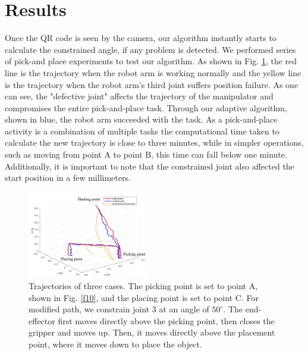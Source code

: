 \documentclass{ieeeaccess}
\newcommand{\degree}{^\circ}
\begin{document}

\section{Results}
\label{section:results}

Once the QR code is seen by the camera, our algorithm instantly starts to calculate the constrained angle, if any problem is detected. We performed series of pick-and place experiments to test our algorithm. As shown in Fig. \ref{f4}, the red line is the trajectory when the robot arm is working normally and the yellow line is the trajectory  when the robot arm's third joint suffers position failure. As one can see, the "defective joint" affects the trajectory of the manipulator and compromises the entire pick-and-place task. Through our adaptive algorithm, shown in blue, the robot arm succeeded with the task. As a pick-and-place activity is a combination of multiple tasks the computational time taken to calculate the new trajectory is close to three minutes, while in simpler operations, such as moving from point A to point B, this time can fall below one minute. Additionally, it is important to note that the constrained joint also affected the start position in a few millimeters.

\begin{figure}[t!]
	\centering \includegraphics[width=0.47\textwidth]{img/f4.pdf}\caption{Trajectories of three cases. The picking point is set to point A, shown in Fig. \ref{f10}, and the placing point is set to point C. For modified path, we constrain joint 3 at an angle of $50 \degree$. The end-effector first moves directly above the picking point, then closes the gripper and moves up. Then, it moves directly above the placement point, where it moves down to place the object.	}
	\label{f4}
\end{figure}
\end{document}
